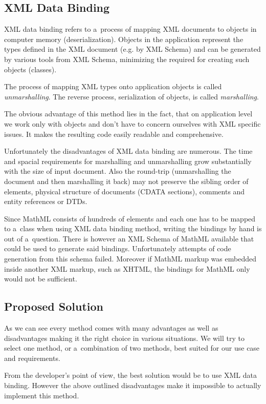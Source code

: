 \documentclass[11pt,oneside,final]{fithesis2}
\begin{document}
\subsection{XML Data Binding} XML data binding refers to a~process of mapping XML documents to objects in computer memory (deserialization). Objects in the application represent the types defined in the XML document (e.g. by XML Schema) and can be generated by various tools from XML Schema, minimizing the required for creating such objects (classes). 

The process of mapping XML types onto application objects is called \textit{unmarshalling}. The reverse process, serialization of objects, is called \textit{marshalling}. 

The obvious advantage of this method lies in the fact, that on application level we work only with objects and don't have to concern ourselves with XML specific issues. It makes the resulting code easily readable and comprehensive.

Unfortunately the disadvantages of XML data binding are numerous. The time and spacial requirements for marshalling and unmarshalling grow substantially with the size of input document. Also the round-trip (unmarshalling the document and then marshalling it back) may not preserve the sibling order of elements, physical structure of documents (CDATA sections), comments and entity references or DTDs.

Since MathML consists of hundreds of elements and each one has to be mapped to a~class when using XML data binding method, writing the bindings by hand is out of a~question. There is however an XML Schema of MathML available that could be used to generate said bindings. Unfortunately attempts of code generation from this schema failed. Moreover if MathML markup was embedded inside another XML markup, such as XHTML, the bindings for MathML only would not be sufficient. 

\subsection{Proposed Solution}
\label{section:inputProcessingSolution}
As we can see every method comes with many advantages as well as disadvantages making it the right choice in various situations. We will try to select one method, or a~combination of two methods, best suited for our use case and requirements. 

From the developer's point of view, the best solution would be to use XML data binding. However the above outlined disadvantages make it impossible to actually implement this method.
\end{document}
